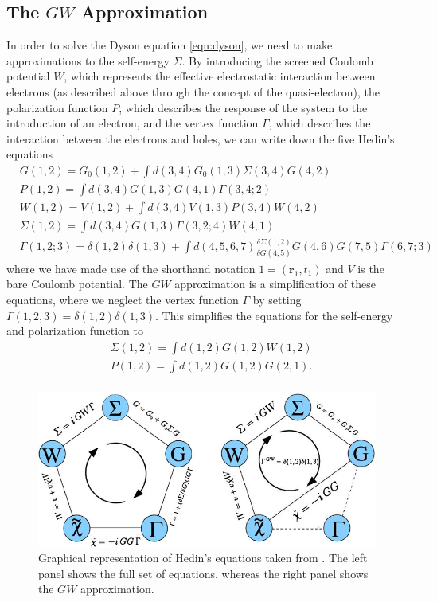 \documentclass[12pt]{caltech_thesis}
\begin{document}
\subsection{The $GW$ Approximation}
In order to solve the Dyson equation \ref{eqn:dyson}, we need to make approximations to the self-energy $\Sigma$. By introducing the screened Coulomb potential $W$, which represents the effective electrostatic interaction between electrons (as described above through the concept of the quasi-electron), the polarization function $P$, which describes the response of the system to the introduction of an electron, and the vertex function $\Gamma$, which describes the interaction between the electrons and holes, we can write down the five Hedin's equations
\begin{equation}
\begin{aligned}
& G(1,2)=G_0(1,2)+\int d(3,4) G_0(1,3) \Sigma(3,4) G(4,2) \\
& P(1,2)=\int d(3,4) G(1,3) G(4,1) \Gamma(3,4 ; 2) \\
& W(1,2)=V(1,2)+\int d(3,4) V(1,3) P(3,4) W(4,2) \\
& \Sigma(1,2)=\int d(3,4) G(1,3) \Gamma(3,2 ; 4) W(4,1) \\
& \Gamma(1,2 ; 3)=\delta(1,2) \delta(1,3)+\int d(4,5,6,7) \frac{\delta \Sigma(1,2)}{\delta G(4,5)} G(4,6) G(7,5) \Gamma(6,7 ; 3)
\end{aligned}
\end{equation}
where we have made use of the shorthand notation $1=(\mathbf{r}_1, t_1)$ and $V$ is the bare Coulomb potential. The $GW$ approximation is a simplification of these equations, where we neglect the vertex function $\Gamma$ by setting $\Gamma (1,2,3)= \delta (1,2) \delta (1,3)$. This simplifies the equations for the self-energy and polarization function to
\begin{equation}
\begin{aligned}
& \Sigma(1,2)=\int d(1,2) G(1,2) W(1,2) \\
& P(1,2)=\int d(1,2) G(1,2) G(2,1). \\
\end{aligned}
\end{equation}
\begin{figure}
    \centering
    \includegraphics[width=\textwidth]{Left-panel-Graphical-representation-of-Hedins-equations-Right-panel-The-four-coupled.jpg}
    \caption{Graphical representation of Hedin's equations taken from \textcite{noauthor_frontiers_nodate}. The left panel shows the full set of equations, whereas the right panel shows the $GW$ approximation.}
    \label{fig:hedin}
\end{figure}
\end{document}
